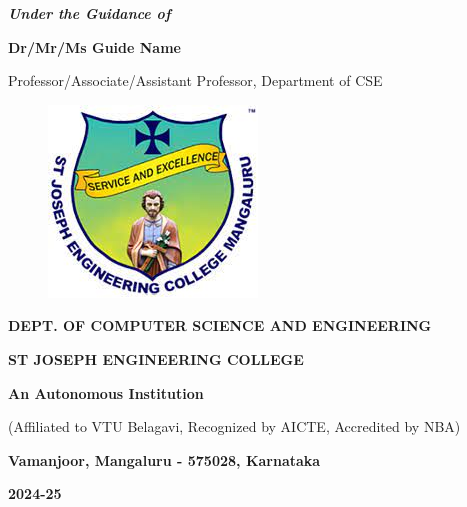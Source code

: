 \documentclass[12pt,a4paper]{report}
\begin{document}
\begin{center}
\vspace{12pt}
\textit{\textbf{Under the Guidance of}}
\par
\vspace{6pt}
\textbf{Dr/Mr/Ms Guide Name }
\par
\vspace{2pt}
\normalsize { Professor/Associate/Assistant Professor, Department of CSE }
\par
\begin{figure}[hbtp]
\centering
\includegraphics[scale=0.5]{./pic/sjeclogo}
\end{figure}
\large \textbf{DEPT. OF COMPUTER SCIENCE AND ENGINEERING}
\par \Large \textbf{ST JOSEPH ENGINEERING COLLEGE}
\par 
\textbf{An Autonomous Institution}
\par
{\large{(Affiliated to VTU Belagavi, Recognized by AICTE, Accredited by NBA)}}
\par
\vspace{3pt}
{\large \textbf{Vamanjoor, Mangaluru - 575028, Karnataka}}
\par 
\vspace{12pt}
{\Large \textbf{2024-25}}
\end{center}
\newpage
\end{document}
